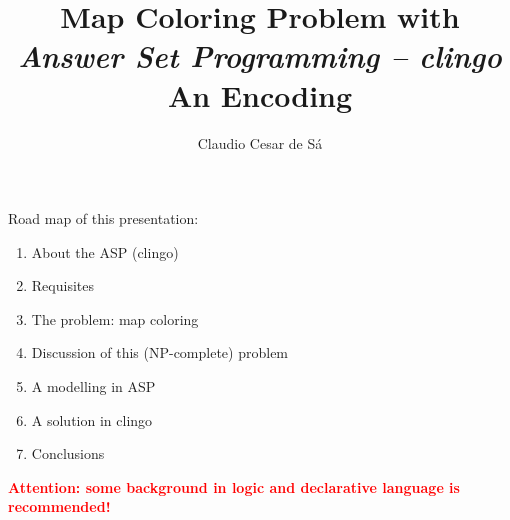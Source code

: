 \documentclass{beamer}
\title[Combinatorial  Optimization] %
{Map Coloring Problem with \\ \textit{Answer Set Programming -- clingo}\\ An Encoding}
\author[Claudio Cesar de Sá] %
{Claudio Cesar de Sá}%
\institute[WhatsTV]{Independent Researcher}
\date[\today] %
\begin{document}
\begin{frame}
  \titlepage
  
\end{frame}








\begin{frame}

\begin{block}{Road map of this presentation:}

\begin{enumerate}

  \item  About the  ASP (clingo)
  \item  Requisites
  \item  The problem: map coloring
  \item  Discussion of this (NP-complete) problem
  \item  A modelling in ASP
  \item  A solution in clingo
  \item  Conclusions

  \end{enumerate}

\end{block}

\pause
\textbf{\textcolor{red}{Attention: some background in logic and declarative language is recommended!}}


\end{frame}
\end{document}
